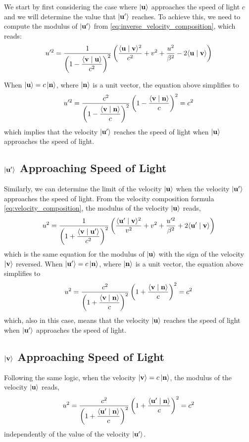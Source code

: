 \documentclass[12pt]{article}
\newcommand{\ip}[2]{\langle #1 \mid #2 \rangle}
\begin{document}
We start by first considering the case where $\ket{\vb{u}}$ approaches the speed of light
$c$ and we will determine the value that $\ket{\vb{u}'}$ reaches. To achieve this, we need
to compute the modulus of $\ket{\vb{u}'}$ from \eqref{eq:inverse_velocity_composition},
which reads:
\begin{equation}
  u'^2 = \frac{1}{\displaystyle\left(1 - \frac{\ip{\vb{v}}{\vb{u}}}{c^2}\right)^2}
  \left(
    \frac{\ip{\vb{u}}{\vb{v}}^2}{c^2} + v^2 + \frac{u^2}{\beta^2}
    - 2\ip{\vb{u}}{\vb{v}}
  \right)
\end{equation}

When $\ket{\vb{u}} = c\ket{\vb{n}}$, where $\ket{\vb{n}}$ is a unit vector, the equation
above simplifies to
\begin{equation}
  u'^2 = \frac{c^2}{\displaystyle\left(1 - \frac{\ip{\vb{v}}{\vb{n}}}{c}\right)^2}
  \left(1 - \frac{\ip{\vb{v}}{\vb{n}}}{c}\right)^2 = c^2
\end{equation}
which implies that the velocity $\ket{\vb{u}'}$ reaches the speed of light when $\ket{\vb{u}}$
approaches the speed of light.

\subsection{$\ket{\vb{u}'}$ Approaching Speed of Light}

Similarly, we can determine the limit of the velocity $\ket{\vb{u}}$ when the velocity
$\ket{\vb{u}'}$ approaches the speed of light. From the velocity composition formula
\eqref{eq:velocity_composition}, the modulus of the velocity $\ket{\vb{u}}$ reads,
\begin{equation}
  u^2 = \frac{1}{\displaystyle\left(1 + \frac{\ip{\vb{v}}{\vb{u}'}}{c^2}\right)^2}
  \left(
    \frac{\ip{\vb{u}'}{\vb{v}}^2}{v^2} + v^2 + \frac{u'^2}{\beta^2}
    + 2\ip{\vb{u}'}{\vb{v}}
  \right)
\end{equation}
which is the same equation for the modulus of $\ket{\vb{u}}$ with the sign of the velocity
$\ket{\vb{v}}$ reversed. When $\ket{\vb{u}'} = c\ket{\vb{n}}$, where $\ket{\vb{n}}$ is a
unit vector, the equation above simplifies to
\begin{equation}
  u^2 = \frac{c^2}{\displaystyle\left(1 + \frac{\ip{\vb{v}}{\vb{n}}}{c}\right)^2}
  \left(1 + \frac{\ip{\vb{v}}{\vb{n}}}{c}\right)^2 = c^2
\end{equation}
which, also in this case, means that the velocity $\ket{\vb{u}}$ reaches the speed of light
when $\ket{\vb{u}'}$ approaches the speed of light.

\subsection{$\ket{\vb{v}}$ Approaching Speed of Light}

Following the same logic, when the velocity $\ket{\vb{v}} = c\ket{\vb{n}}$, the modulus of
the velocity $\ket{\vb{u}}$ reads,
\begin{equation}
  u^2 = \frac{c^2}{\displaystyle\left(1 + \frac{\ip{\vb{u}'}{\vb{n}}}{c}\right)^2}
  \left(1 + \frac{\ip{\vb{u}'}{\vb{n}}}{c}\right)^2 = c^2
\end{equation}
independently of the value of the velocity $\ket{\vb{u}'}$.
\end{document}
